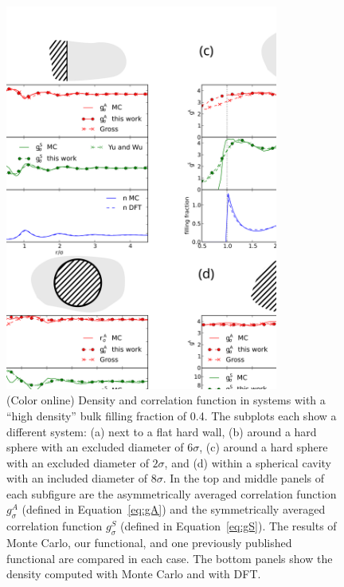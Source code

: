 \documentclass[letterpaper,twocolumn,amsmath,amssymb,pre]{revtex4-1}
\begin{document}
\begin{figure}
  \noindent\includegraphics[width=0.8\textwidth]{figs/high-density}
  \caption{ (Color online) Density and correlation function in systems
    with a ``high density'' bulk filling fraction of 0.4.  The
    subplots each show a different system: (a) next to a flat hard wall, (b)
    around a hard sphere with an excluded diameter of $6\sigma$, (c)
    around a hard sphere with an excluded diameter of $2\sigma$, and
    (d) within a spherical cavity with an included diameter of $8\sigma$.
    In the top and middle panels of each subfigure are the
    asymmetrically averaged correlation function $g_\sigma^A$ (defined
    in Equation~\ref{eq:gA}) and the symmetrically averaged
    correlation function $g_\sigma^S$ (defined in
    Equation~\ref{eq:gS}).  The results of Monte Carlo, our
    functional, and one previously published
    functional\cite{gross2009density,
      yu2002fmt-dft-inhomogeneous-associating} are compared in each
    case.  The bottom panels show the density computed with
    Monte Carlo and with DFT.}
  \label{fig:high-density}
\end{figure}
\end{document}
